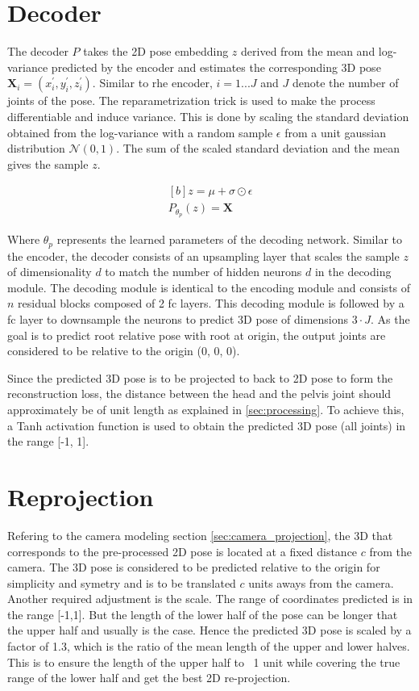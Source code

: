 \section{Decoder}

The decoder $P$ takes the 2D pose embedding $z$ derived from the mean and log-variance predicted by the encoder and estimates the corresponding 3D pose $\textbf{X}_i = (x^\prime_i, y^\prime_i, z^\prime_i)$. Similar to rhe encoder, $i = 1 ... J$ and $J$ denote the number of joints of the pose. The reparametrization trick is used to make the process differentiable and induce variance. This is done by scaling the standard deviation obtained from the log-variance with a random sample $\epsilon$ from a unit gaussian distribution $\mathcal{N}(0,1)$. The sum of the scaled standard deviation and the mean gives the sample $z$.

\begin{equation} \label{eqn:P_fn}
    \begin{gathered}[b]
        z = \mu + \sigma \odot \epsilon \\
        P_{\theta_p}(z) = \textbf{X}
    \end{gathered}
\end{equation}

Where $\theta_p$ represents the learned parameters of the decoding network. Similar to the encoder, the decoder consists of an upsampling layer that scales the sample $z$ of dimensionality $d$ to match the number of hidden neurons $d$ in the decoding module. The decoding module is identical to the encoding module and consists of $n$ residual blocks composed of 2 \ac{fc} layers. This decoding module is followed by a \ac{fc} layer to downsample the neurons to predict 3D pose of dimensions $3\!\cdot\!J$. As the goal is to predict root relative pose with root at origin, the output joints are considered to be relative to the origin (0, 0, 0).

Since the predicted 3D pose is to be projected to back to 2D pose to form the reconstruction loss, the distance between the head and the pelvis joint should approximately be of unit length as explained in \ref{sec:processing}. To achieve this, a Tanh activation function is used to obtain the predicted 3D pose (all joints) in the range [-1, 1].

\section{Reprojection}
Refering to the camera modeling section \ref{sec:camera_projection}, the 3D that corresponds to the pre-processed 2D pose is located at a fixed distance $c$ from the camera. The 3D pose is considered to be predicted relative to the origin for simplicity and symetry and is to be translated $c$ units aways from the camera. Another required adjustment is the scale. The range of coordinates predicted is in the range [-1,1]. But the length of the lower half of the pose can be longer that the upper half and usually is the case. Hence the predicted 3D pose is scaled by a factor of 1.3, which is the ratio of the mean length of the upper and lower halves. This is to ensure the length of the upper half to ~1 unit while covering the true range of the lower half and get the best 2D re-projection.

